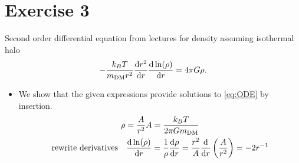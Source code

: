 \documentclass[11pt,a4paper]{article}
\begin{document}
\section{Exercise 3}
Second order differential equation from lectures for density assuming isothermal halo
\begin{equation}
-\frac{k_B T}{m_\text{DM}r^2}\dv{r^2}{r}\dv{\ln(\rho)}{r} = 4\pi G \rho.
\label{eq:ODE}
\end{equation}
\begin{itemize}
\item We show that the given expressions provide solutions to \cref{eq:ODE} by insertion.
\begin{gather*}
\rho = \frac{A}{r^2}  A = \frac{k_B T}{2\pi G m_\text{DM}}
\\
\qq*{rewrite derivatives} \dv{\ln(\rho)}{r} = \frac{1}{\rho}\dv{\rho}{r} = \frac{r^2}{A}\dv{r} \left(\frac{A}{r^2}\right) = - 2 r^{-1}
\end{gather*}

\end{itemize}
\end{document}
